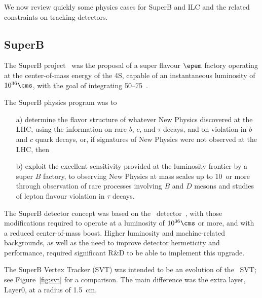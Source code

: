 We now review quickly some physics cases for SuperB and ILC and the related constraints on 
tracking detectors.
\subsection{SuperB}

The SuperB project~\cite{Baszczyk:2013xua} was the proposal of a super flavour $\epem$ factory operating at the 
 center-of-mass energy of the \Y4S, capable of an instantaneous 
 luminosity of  $10^{36}\cms$, with the goal of integrating 50--75~\invab.

The SuperB physics program was to 
\begin{itemize}
\item[a)]determine the flavor structure of whatever New Physics discovered at the LHC, 
using the information on rare $b$, $c$, and $\tau$ decays, and on \CP
violation in $b$ and $c$ quark decays, or, if  signatures of New Physics were not observed at the LHC,
then
\item[b)]  exploit the excellent sensitivity provided at the luminosity frontier by
a super $B$ factory, to
observing New Physics at mass scales up to 10~\tev or more through
observation of rare processes involving $B$ and $D$ mesons and studies
of lepton flavour violation in $\tau$ decays.
\end{itemize}

The SuperB detector concept was based on the \babar\ detector~\cite{AUBERT20021}, with
those modifications required to operate at a luminosity of $10^{36}\cms$
or more, and with a reduced center-of-mass boost.
Higher luminosity and machine-related backgrounds, as well
as the need to  improve detector hermeticity
and performance, required significant R\&D
to be able to implement this upgrade.


The SuperB Vertex Tracker (SVT) was intended to be an evolution of the \babar\ 
SVT; see Figure~\ref{fig:svt} for a comparison. The main difference was the extra layer, Layer0, 
at a radius of 1.5~cm.

